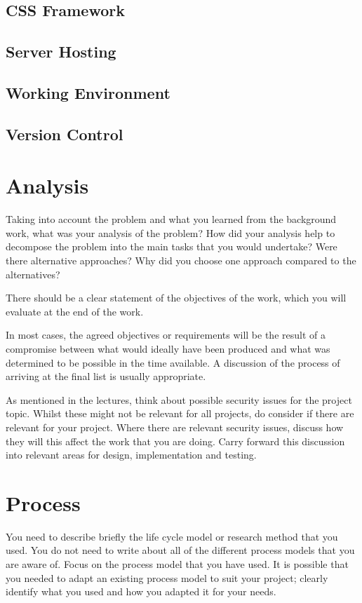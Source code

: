 \subsection{CSS Framework}



\subsection{Server Hosting}



\subsection{Working Environment}



\subsection{Version Control}



\section{Analysis}
Taking into account the problem and what you learned from the background work, what was your analysis of the problem? How did your analysis help to decompose the problem into the main tasks that you would undertake? Were there alternative approaches? Why did you choose one approach compared to the alternatives? 

There should be a clear statement of the objectives of the work, which you will evaluate at the end of the work. 

In most cases, the agreed objectives or requirements will be the result of a compromise between what would ideally have been produced and what was determined to be possible in the time available. A discussion of the process of arriving at the final list is usually appropriate.

As mentioned in the lectures, think about possible security issues for the project topic. Whilst these might not be relevant for all projects, do consider if there are relevant for your project. Where there are relevant security issues, discuss how they will this affect the work that you are doing. Carry forward this discussion into relevant areas for design, implementation and testing.

\section{Process}
You need to describe briefly the life cycle model or research method that you used. You do not need to write about all of the different process models that you are aware of. Focus on the process model that you have used. It is possible that you needed to adapt an existing process model to suit your project; clearly identify what you used and how you adapted it for your needs.


